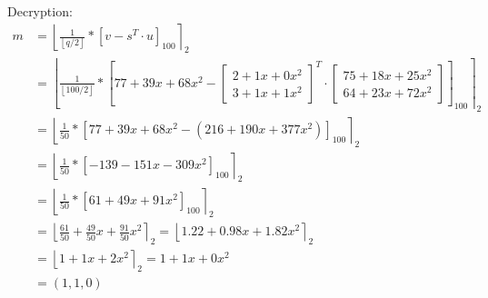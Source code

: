 Decryption:
\begin{align*}
  m & = \left\lfloor \frac{1}{\left\lfloor q/2\right\rfloor} *\left[v-s^T \cdot u\right]_{100}\right\rceil _2                                         \\
    & = \left\lfloor \frac{1}{\left\lfloor 100/2\right\rfloor} * \left[77+39x+68x^2-
  \begin{bmatrix}2+ 1x + 0x^2 \\ 3+1x+1x^2 \end{bmatrix}^T
  \cdot
  \begin{bmatrix}75+18x+25x^2 \\ 64+23x+72x^2 \end{bmatrix} \right]_{100}\right\rceil _2                                                  \\
    & = \left\lfloor \frac{1}{50} * \left[77+39x+68x^2-(216+190x+377x^2)\right]_{100}\right\rceil _2                                                  \\
    & = \left\lfloor \frac{1}{50} * \left[-139-151x-309x^2\right]_{100}\right\rceil _2                                                          \\
    & = \left\lfloor \frac{1}{50} * \left[61+49x+91x^2\right]_{100} \right\rceil _2                                                                      \\
    & = \left\lfloor \frac{61}{50} +\frac{49}{50}x+\frac{91}{50}x^2\right\rceil _2  = \left\lfloor 1.22+0.98x+1.82x^2\right\rceil _2 \\
    & = \left\lfloor1+1x+2x^2\right\rceil _2 =           1+1x+0x^2                                                                   \\
    &= (1,1,0)
\end{align*}